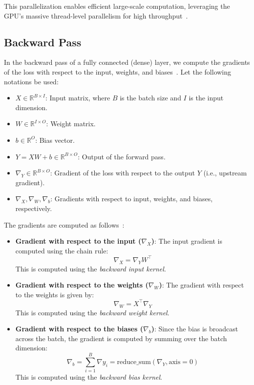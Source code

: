 This parallelization enables efficient large-scale computation, leveraging the GPU's massive thread-level parallelism for high throughput~\cite{gcore_gpu_dl, digitalocean_gpu_opt}.

\subsection{Backward Pass}

In the backward pass of a fully connected (dense) layer, we compute the gradients of the loss with respect to the input, weights, and biases~\cite{goodfellow2016deep}. Let the following notations be used:

\begin{itemize}
    \item \( X \in \mathbb{R}^{B \times I} \): Input matrix, where \( B \) is the batch size and \( I \) is the input dimension.
    \item \( W \in \mathbb{R}^{I \times O} \): Weight matrix.
    \item \( b \in \mathbb{R}^{O} \): Bias vector.
    \item \( Y = XW + b \in \mathbb{R}^{B \times O} \): Output of the forward pass.
    \item \( \nabla_Y \in \mathbb{R}^{B \times O} \): Gradient of the loss with respect to the output \( Y \) (i.e., upstream gradient).
    \item \( \nabla_X, \nabla_W, \nabla_b \): Gradients with respect to input, weights, and biases, respectively.
\end{itemize}

The gradients are computed as follows~\cite{goodfellow2016deep, bishop2006pattern}:

\begin{itemize}
    \item \textbf{Gradient with respect to the input (\( \nabla_X \))}:  
    The input gradient is computed using the chain rule:
    \[
        \nabla_X = \nabla_Y W^\top
    \]
    This is computed using the \textit{backward input kernel}.

    \item \textbf{Gradient with respect to the weights (\( \nabla_W \))}:  
    The gradient with respect to the weights is given by:
    \[
        \nabla_W = X^\top \nabla_Y
    \]
    This is computed using the \textit{backward weight kernel}.

    \item \textbf{Gradient with respect to the biases (\( \nabla_b \))}:  
    Since the bias is broadcast across the batch, the gradient is computed by summing over the batch dimension:
    \[
        \nabla_b = \sum_{i=1}^{B} \nabla y_i = \text{reduce\_sum}(\nabla_Y, \text{axis}=0)
    \]
    This is computed using the \textit{backward bias kernel}.
\end{itemize}

